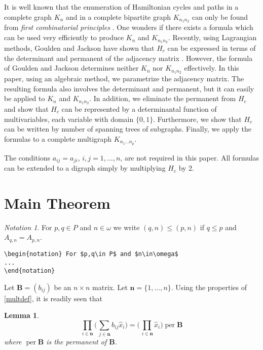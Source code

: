 \documentclass{article}
\newtheorem{lem}[thm]{Lemma}
\theoremstyle{definition}
\theoremstyle{remark}
\newtheorem*{notation}{Notation}
\DeclareMathOperator{\per}{per}
\begin{document}
It is well known that the enumeration of Hamiltonian cycles and paths in
a complete graph $K_n$ and in a complete bipartite graph $K_{n_1n_2}$
can only be found from \textit{first combinatorial principles}
\cite{hapa:graphenum}. One wonders if there exists a formula which can
be used very efficiently to produce $K_n$ and $K_{n_1n_2}$. Recently,
using Lagrangian methods, Goulden and Jackson have shown that $H_c$ can
be expressed in terms of the determinant and permanent of the adjacency
matrix \cite{gouja:lagrmeth}. However, the formula of Goulden and
Jackson determines neither $K_n$ nor $K_{n_1n_2}$ effectively. In this
paper, using an algebraic method, we parametrize the adjacency matrix.
The resulting formula also involves the determinant and permanent, but
it can easily be applied to $K_n$ and $K_{n_1n_2}$. In addition, we
eliminate the permanent from $H_c$ and show that $H_c$ can be
represented by a determinantal function of multivariables, each variable
with domain $\{0,1\}$. Furthermore, we show that $H_c$ can be written by
number of spanning trees of subgraphs. Finally, we apply the formulas to
a complete multigraph $K_{n_1\dots n_p}$.

The conditions $a_{ij}=a_{ji}$, $i,j=1,\dots,n$, are not required in
this paper. All formulas can be extended to a digraph simply by
multiplying $H_c$ by 2.

\section{Main Theorem}
\label{s:mt}

\begin{notation} For $p,q\in P$ and $n\in\omega$ we write
$(q,n)\le(p,n)$ if $q\le p$ and $A_{q,n}=A_{p,n}$.
\begin{verbatim}
\begin{notation} For $p,q\in P$ and $n\in\omega$
...
\end{notation}
\end{verbatim}
\end{notation}

Let $\symbf{B}=(b_{ij})$ be an $n\times n$ matrix. Let $\symbf{n}=\{1,
\dots,n\}$. Using the properties of \eqref{multdef}, it is readily seen
that

\begin{lem}\label{lem-per}
\begin{equation}
\prod_{i\in\symbf{n}}
\biggl(\sum_{\,j\in\symbf{n}}b_{ij}\hat x_i\biggr)
=\biggl(\prod_{\,i\in\symbf{n}}\hat x_i\biggr)\per \symbf{B}
\end{equation}
where $\per \symbf{B}$ is the permanent of $\symbf{B}$.
\end{lem}
\end{document}
